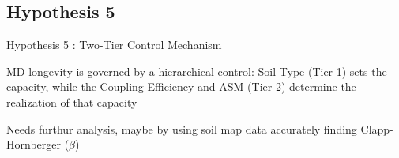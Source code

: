 \subsection{Hypothesis 5}
\begin{frame}{Hypothesis 5 : Two-Tier Control Mechanism}
	\vspace{-0.1cm}
	\begin{block}{MD longevity is governed by a hierarchical control: Soil Type (Tier 1) sets the capacity, while the Coupling Efficiency and ASM (Tier 2) determine the realization of that capacity}\end{block}

	\vspace{-0.5cm}
	\begin{alertblock}{\tiny Needs furthur analysis, maybe by using soil map data accurately finding Clapp-Hornberger ($\beta$)}\end{alertblock}


\end{frame}
